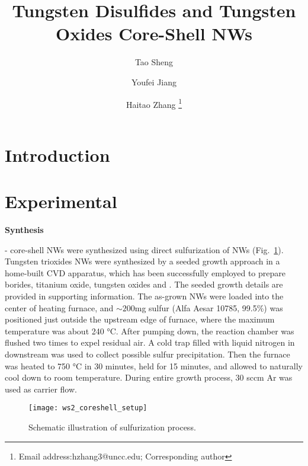 \documentclass[11pt]{article} %
\begin{document}
\title{Tungsten Disulfides and Tungsten Oxides Core-Shell NWs}
\author{Tao Sheng}
\author{Youfei Jiang}
\author{Haitao Zhang%
\thanks{Email address:hzhang3@uncc.edu; Corresponding author}}

\maketitle

\section{Introduction}



\section{Experimental}

\textbf{Synthesis}

- core-shell NWs were synthesized using direct sulfurization of  NWs (Fig.~\ref{fig0}). Tungsten trioxides NWs were synthesized by a seeded growth approach in a home-built CVD apparatus, which has been successfully employed to prepare borides\cite{Amin2009a}, titanium oxide\cite{Amin2007}, tungsten oxides\cite{Zhang2010} and . The seeded growth details are provided in supporting information. The as-grown  NWs were loaded into the center of heating furnace, and $\sim200$mg sulfur (Alfa Aesar 10785, 99.5\%) was positioned just outside the upstream edge of furnace, where the maximum temperature was about 240 \si{\degreeCelsius}. After pumping down, the reaction chamber was flushed two times to expel residual air. A cold trap filled with liquid nitrogen in downstream was used to collect possible sulfur precipitation. Then the furnace was heated to 750 \si{\degreeCelsius} in 30 minutes, held for 15 minutes, and allowed to naturally cool down to room temperature. During entire growth process, 30 sccm Ar was used as carrier flow.

\begin{figure}[htb]
\centering
\texttt{[image: ws2\_coreshell\_setup]}
\caption{Schematic illustration of sulfurization process.}
\label{fig0}
\end{figure}
\end{document}
